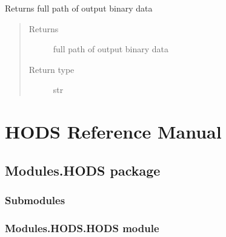 \documentclass[letterpaper,10pt,english]{sphinxmanual}
\begin{document}
\begin{fulllineitems}

\begin{fulllineitems}
\label{\detokenize{MouseReferenceManual:Modules.Base.ParameterEstimationModuleBaseClass.outputFileName}}
Returns full path of output binary data
\begin{quote}\begin{description}
\item[{Returns}] \leavevmode
full path of output binary data

\item[{Return type}] \leavevmode
str

\end{description}\end{quote}

\end{fulllineitems}


\end{fulllineitems}



\chapter{HODS Reference Manual}
\label{\detokenize{HodsReferenceManual:hods-reference-manual}}\label{\detokenize{HodsReferenceManual::doc}}

\section{Modules.HODS package}
\label{\detokenize{HodsReferenceManual:modules-hods-package}}

\subsection{Submodules}
\label{\detokenize{HodsReferenceManual:submodules}}

\subsection{Modules.HODS.HODS module}
\label{\detokenize{HodsReferenceManual:module-Modules.HODS.HODS}}\label{\detokenize{HodsReferenceManual:modules-hods-hods-module}}
\end{document}
